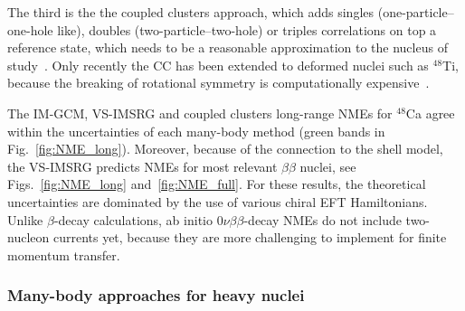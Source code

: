 The third is the the coupled clusters approach, which adds singles (one-particle--one-hole like), doubles (two-particle--two-hole) or triples correlations on top a reference state, which needs to be a reasonable approximation to the nucleus of study~\cite{Hagen:2013nca}. Only recently the CC has been extended to deformed nuclei such as $^{48}$Ti, because the breaking of rotational symmetry is computationally expensive~\cite{Novario:2020dmr}.

The IM-GCM, VS-IMSRG and coupled clusters long-range NMEs for $^{48}$Ca agree within the uncertainties of each many-body method (green bands in Fig.~\ref{fig:NME_long}). Moreover, because of the connection to the shell model, the VS-IMSRG predicts NMEs for most relevant $\beta\beta$ nuclei, see Figs.~\ref{fig:NME_long} and~\ref{fig:NME_full}. For these results, the theoretical uncertainties are dominated by the use of various chiral EFT Hamiltonians. Unlike $\beta$-decay calculations, ab initio $0\nu\beta\beta$-decay NMEs do not include two-nucleon currents yet, because they are more challenging to implement for finite momentum transfer.

\subsubsection{Many-body approaches for heavy nuclei}
\label{sec:maybody_phen}

